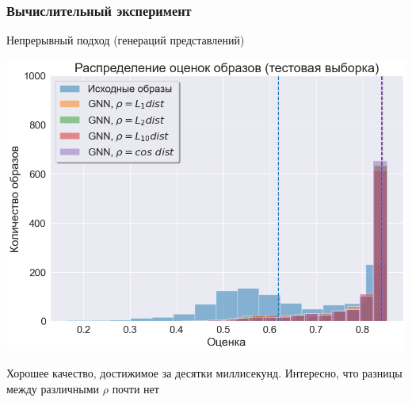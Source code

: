 \documentclass[10pt]{beamer}
\begin{document}
\begin{frame}
	\frametitle{Вычислительный эксперимент}
	\begin{block}{Непрерывный подход (генераций представлений)}
		\vspace{-0.3cm}
		\begin{center}
			\includegraphics[scale = 0.47]{../figures/GNN_at_least_5_subset1000_test.png}
		\end{center}
	\end{block}
	Хорошее качество, достижимое за десятки миллисекунд. Интересно, что разницы между различными $\rho$ почти нет
\end{frame}
\end{document}
